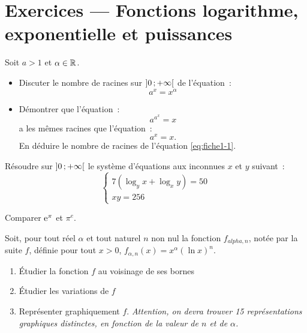 \section{Exercices --- Fonctions logarithme, exponentielle et puissances}
\begin{exercice}
    Soit \(a > 1\) et \(\alpha \in \mathbb{R}\).
    \begin{itemize}
        \item Discuter le nombre de racines sur \(\left] 0 \, ;  +\infty \right[\) de l'équation~:
            \begin{equation}
                \label{eq:fiche1-1}
                a^x = x^\alpha
            \end{equation}
        \item Démontrer que l'équation~:
            \begin{equation}
                a^{a^x} = x
            \end{equation}
            a les mêmes racines que l'équation~:
            \begin{equation}
                a^x = x.
            \end{equation}
            En déduire le nombre de racines de l'équation \eqref{eq:fiche1-1}.
    \end{itemize}
\end{exercice}
\begin{exercice}
    Résoudre sur \(\left] 0 \, ;  +\infty \right[\) le système d'équations aux inconnues \(x\) et \(y\) suivant~:
    \begin{equation}
       \begin{cases} 7(\log_y x +\log_x y) = 50 \\ xy = 256 \end{cases} 
    \end{equation}
\end{exercice}
\begin{exercice}
    Comparer \(\operatorname{e}^\pi\) et \(\pi^e\).
\end{exercice}
\begin{exercice}
    Soit, pour tout réel \(\alpha\) et tout naturel \(n\) non nul la fonction \(f_{alpha, n}\), notée par la suite $f$, définie pour tout \(x>0\), \(f_{\alpha, n}(x) = x^\alpha (\ln x)^n \).
    \begin{enumerate}
        \item Étudier la fonction \(f\) au voisinage de ses bornes
        \item Étudier les variations de \(f\)
        \item Représenter graphiquement \(f\). \emph{Attention, on devra trouver 15 représentations graphiques distinctes, en fonction de la valeur de \(n\) et de \(\alpha\).}
    \end{enumerate}
\end{exercice}
